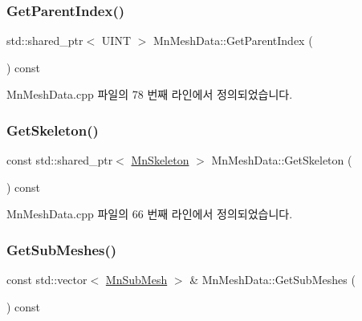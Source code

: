 \mbox{\label{class_m_n_l_1_1_mn_mesh_data_a7d8e1da3cec285f2b71c957ab83f1949}} 
\subsubsection{\texorpdfstring{Get\+Parent\+Index()}{GetParentIndex()}}
{\footnotesize\ttfamily std\+::shared\+\_\+ptr$<$ U\+I\+NT $>$ Mn\+Mesh\+Data\+::\+Get\+Parent\+Index (\begin{DoxyParamCaption}{ }\end{DoxyParamCaption}) const}



Mn\+Mesh\+Data.\+cpp 파일의 78 번째 라인에서 정의되었습니다.

\mbox{\label{class_m_n_l_1_1_mn_mesh_data_adc90604cc77bbdde83e0a539822db40e}} 
\subsubsection{\texorpdfstring{Get\+Skeleton()}{GetSkeleton()}}
{\footnotesize\ttfamily const std\+::shared\+\_\+ptr$<$ \hyperlink{class_m_n_l_1_1_mn_skeleton}{Mn\+Skeleton} $>$ Mn\+Mesh\+Data\+::\+Get\+Skeleton (\begin{DoxyParamCaption}{ }\end{DoxyParamCaption}) const}



Mn\+Mesh\+Data.\+cpp 파일의 66 번째 라인에서 정의되었습니다.

\mbox{\label{class_m_n_l_1_1_mn_mesh_data_a15ddb3594a7ead8f11f788a45d00ce59}} 
\subsubsection{\texorpdfstring{Get\+Sub\+Meshes()}{GetSubMeshes()}}
{\footnotesize\ttfamily const std\+::vector$<$ \hyperlink{struct_m_n_l_1_1_mn_sub_mesh}{Mn\+Sub\+Mesh} $>$ \& Mn\+Mesh\+Data\+::\+Get\+Sub\+Meshes (\begin{DoxyParamCaption}{ }\end{DoxyParamCaption}) const}



